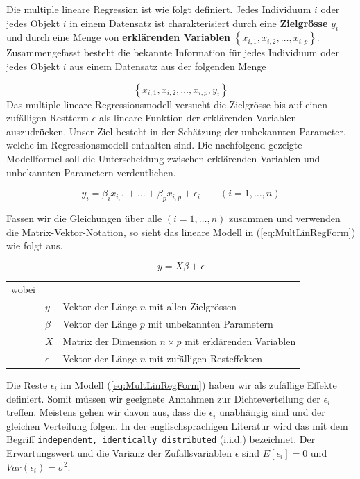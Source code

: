 \documentclass[]{book}
\begin{document}
Die multiple lineare Regression ist wie folgt definiert. Jedes
Individuum \(i\) oder jedes Objekt \(i\) in einem Datensatz ist
charakterisiert durch eine \textbf{Zielgrösse} \(y_i\) und durch eine
Menge von \textbf{erklärenden Variablen}
\(\left\{x_{i,1}, x_{i,2}, \ldots, x_{i,p}\right\}\). Zusammengefasst
besteht die bekannte Information für jedes Individuum oder jedes Objekt
\(i\) aus einem Datensatz aus der folgenden Menge

\[\left\{x_{i,1}, x_{i,2}, \ldots, x_{i,p}, y_i\right\}\] Das multiple
lineare Regressionsmodell versucht die Zielgrösse bis auf einen
zufälligen Restterm \(\epsilon\) als lineare Funktion der erklärenden
Variablen auszudrücken. Unser Ziel besteht in der Schätzung der
unbekannten Parameter, welche im Regressionsmodell enthalten sind. Die
nachfolgend gezeigte Modellformel soll die Unterscheidung zwischen
erklärenden Variablen und unbekannten Parametern verdeutlichen.

\begin{equation}
y_i = \beta_i x_{i,1} + \ldots + \beta_p x_{i,p} + \epsilon_i \qquad (i = 1, \ldots, n)
\label{eq:MultLinRegForm}
\end{equation}

Fassen wir die Gleichungen über alle \((i = 1, \ldots, n)\) zusammen und
verwenden die Matrix-Vektor-Notation, so sieht das lineare Modell in
(\ref{eq:MultLinRegForm}) wie folgt aus.

\begin{equation}
y = X\beta + \epsilon
\label{eq:MultLinRegMatVec}
\end{equation}

\begin{tabular}{lll}
wobei  &              & \\
       &  $y$         &  Vektor der Länge $n$ mit allen Zielgrössen \\
       &  $\beta$     &  Vektor der Länge $p$ mit unbekannten Parametern \\
       &  $X$         &  Matrix der Dimension $n\times p$ mit erklärenden Variablen \\
       &  $\epsilon$  &  Vektor der Länge $n$ mit zufälligen Resteffekten
\end{tabular}

Die Reste \(\epsilon_i\) im Modell (\ref{eq:MultLinRegForm}) haben wir
als zufällige Effekte definiert. Somit müssen wir geeignete Annahmen zur
Dichteverteilung der \(\epsilon_i\) treffen. Meistens gehen wir davon
aus, dass die \(\epsilon_i\) unabhängig sind und der gleichen Verteilung
folgen. In der englischsprachigen Literatur wird das mit dem Begriff
\texttt{independent,\ identically\ distributed} (i.i.d.) bezeichnet. Der
Erwartungswert und die Varianz der Zufallsvariablen \(\epsilon\) sind
\(E\left[\epsilon_i \right] = 0\) und \(Var(\epsilon_i) = \sigma^2\).
\end{document}
